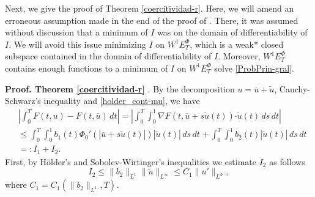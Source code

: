 \documentclass[twoside]{elsarticle}
\theoremstyle{remark}
\newcommand{\orlnor}{\|_{L^{\Phi}}}
\newcommand{\ephi}{E^{\Phi}}
\newcommand{\wphiet}{W^{1}\ephi_T}
\renewcommand{\b}[1]{\boldsymbol{#1}}
\newcommand{\ccdot}{\b{\cdot}}
\renewcommand{\leq}{\leqslant}
\begin{document}
Next, we give the proof of Theorem \ref{coercitividad-r}.  Here,  we will amend an 
erroneous assumption made in the end of the proof of  \cite[Thm. 6.2]{ABGMS2015}. 
There, it was assumed without discussion that  a minimum of  $I$ was on the domain of differentiability of $I$. 
We will avoid  this issue  minimizing $I$ on $\wphiet$, which is a weak* closed subspace  contained in the  domain of differentiability of $I$. Moreover, $\wphiet$ contains enough functions to a minimum of $I$ on $\wphiet$ solve \eqref{ProbPrin-gral}.
\vspace{.4cm}

\noindent\textbf{Proof. Theorem \ref{coercitividad-r} }. By the decomposition $u=\overline{u}+\tilde{u}$,   Cauchy-Schwarz's inequality
and \eqref{holder_cont-mu}, we have
\begin{equation}\label{cota-diferencia-F}
\begin{split}
&\left|\int_0^T F(t,u)-F(t,\overline{u})\,dt\right|=
\left|\int_0^T \int_0^1 \nabla F(t,\overline{u}+s\tilde{u}(t))\ccdot \tilde{u}(t) \,ds \,dt\right|
\\
&\leq \int_0^T \int_0^1 b_1(t)\Phi_0'(|\overline{u}+s\tilde{u}(t)|)|\tilde{u}(t)|\,ds\,dt+
\int_0^T \int_0^1 b_2(t)|\tilde{u}(t)|\,ds\,dt
\\
&=:I_1+I_2.
\end{split}
\end{equation}
First, by H\"older's and Sobolev-Wirtinger's inequalities we estimate $I_2$ as follows
\begin{equation}\label{cota-i2}
I_2\leq \|b_2\|_{L^1} \|\tilde{u}\|_{L^{\infty}}\leq
C_1\|u'\orlnor,
\end{equation}
 where $C_1=C_1(\|b_2\|_{L^1}, T)$. 
\end{document}
